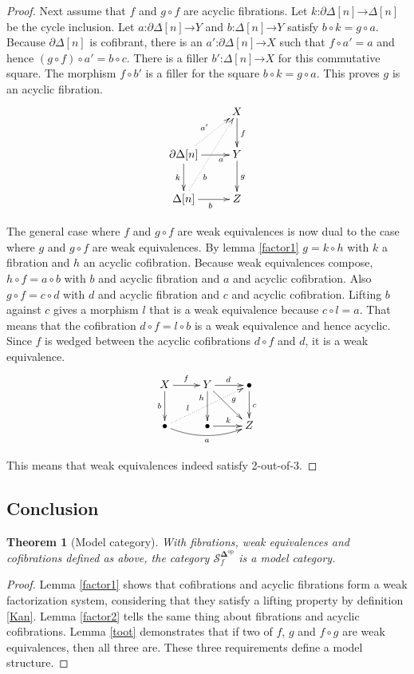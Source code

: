 \documentclass{amsart}
\theoremstyle{plain}
\newtheorem{theorem}{Theorem}
\theoremstyle{definition}
\newcommand\cat\mathcal
\newcommand\dual{^{\mathrm{op}}}
\newcommand\simCat{\mathbf\Delta}
\newcommand\s{^{\simCat\dual}}
\newcommand\of{\mathord:}
\renewcommand\to{\mathord\rightarrow}
\newcommand\simplex\Delta
\newcommand\cycle{\partial\Delta}
\newcommand\f{_f}
\begin{document}
\begin{proof}
Next assume that $f$ and $g\circ f$ are acyclic fibrations. Let $k\of\cycle[n]\to\simplex[n]$ be the cycle inclusion. Let $a\of\cycle[n]\to Y$ and $b\of\simplex[n]\to Y$ satisfy $b\circ k = g \circ a$. Because $\cycle[n]$ is cofibrant, there is an $a'\of \cycle[n]\to X$ such that $f\circ a' = a$ and hence $(g\circ f)\circ a' = b\circ c$. There is a filler $b'\of\simplex[n]\to X$ for this commutative square. The morphism $f\circ b'$ is a filler for the square $b\circ k = g \circ a$. This proves $g$ is an acyclic fibration.
\[\xymatrix{
&X\ar[d]^f\\
\cycle[n]\ar[d]_k\ar[r]_(.7)a\ar@{.>}[ur]^{a'} &Y\ar[d]^g\\
\simplex[n]\ar[r]_b\ar@{.>}[uur]_(.3)b &Z
}\]

The general case where $f$ and $g\circ f$ are weak equivalences is now dual to the case where $g$ and $g\circ f$ are weak equivalences. By lemma \ref{factor1} $g=k\circ h$ with $k$ a fibration and $h$ an acyclic cofibration. Because weak equivalences compose, $h\circ f = a\circ b$ with $b$ and acyclic fibration and $a$ and acyclic cofibration. Also $g\circ f = c\circ d$ with $d$ and acyclic fibration and $c$ and acyclic cofibration. Lifting $b$ against $c$ gives a morphism $l$ that is a weak equivalence because $c\circ l = a$. That means that the cofibration $d\circ f = l\circ b$ is a weak equivalence and hence acyclic. Since $f$ is wedged between the acyclic cofibrations $d\circ f$ and $d$, it is a weak equivalence. 
\[\xymatrix{
X\ar[r]^f\ar[d]_b & Y\ar[d]_(.3)h\ar[r]^d\ar[dr]^g & \bullet\ar[d]^c\\
\bullet\ar@/_2ex/[rr]_a\ar@{.>}[urr]^(.3)l & \bullet\ar[r]^k & Z
}\]

This means that weak equivalences indeed satisfy 2-out-of-3.
\end{proof}

\subsection{Conclusion}

\begin{theorem}[Model category]
With fibrations, weak equivalences and cofibrations defined as above, the category $\cat S\s\f$ is a model category.
\label{model category}
\end{theorem}

\begin{proof}
Lemma \ref{factor1} shows that cofibrations and acyclic fibrations form a weak factorization system, considering that they satisfy a lifting property by definition \ref{Kan}. Lemma \ref{factor2} tells the same thing about fibrations and acyclic cofibrations. Lemma \ref{toot} demonstrates that if two of $f$, $g$ and $f\circ g$ are weak equivalences, then all three are. These three requirements define a model structure.
\end{proof}
\end{document}
